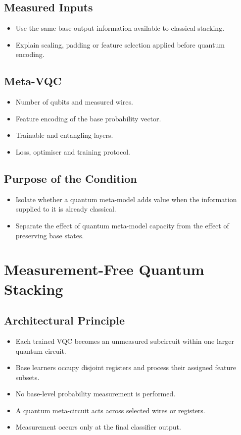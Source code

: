 \documentclass[]{UCD_CS_MSc_AAI_Report}
\begin{document}
\subsection{Measured Inputs}
\begin{itemize}
    \item Use the same base-output information available to classical stacking.
    \item Explain scaling, padding or feature selection applied before quantum encoding.
\end{itemize}

\subsection{Meta-VQC}
\begin{itemize}
    \item Number of qubits and measured wires.
    \item Feature encoding of the base probability vector.
    \item Trainable and entangling layers.
    \item Loss, optimiser and training protocol.
\end{itemize}

\subsection{Purpose of the Condition}
\begin{itemize}
    \item Isolate whether a quantum meta-model adds value when the information supplied to it is already classical.
    \item Separate the effect of quantum meta-model capacity from the effect of preserving base states.
\end{itemize}

\section{Measurement-Free Quantum Stacking}
\label{sec:method-coherent}

\subsection{Architectural Principle}
\begin{itemize}
    \item Each trained VQC becomes an unmeasured subcircuit within one larger quantum circuit.
    \item Base learners occupy disjoint registers and process their assigned feature subsets.
    \item No base-level probability measurement is performed.
    \item A quantum meta-circuit acts across selected wires or registers.
    \item Measurement occurs only at the final classifier output.
\end{itemize}
\end{document}
